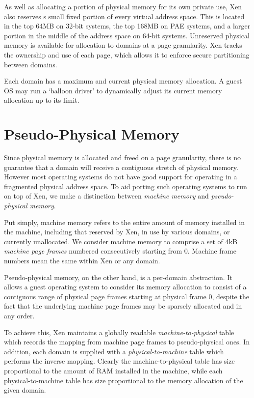 \documentclass[11pt,twoside,final,openright,a4paper]{report}
\begin{document}
As well as allocating a portion of physical memory for its own private
use, Xen also reserves s small fixed portion of every virtual address
space. This is located in the top 64MB on 32-bit systems, the top
168MB on PAE systems, and a larger portion in the middle of the
address space on 64-bit systems. Unreserved physical memory is
available for allocation to domains at a page granularity.  Xen tracks
the ownership and use of each page, which allows it to enforce secure
partitioning between domains.

Each domain has a maximum and current physical memory allocation.  A
guest OS may run a `balloon driver' to dynamically adjust its current
memory allocation up to its limit.


\section{Pseudo-Physical Memory}

Since physical memory is allocated and freed on a page granularity,
there is no guarantee that a domain will receive a contiguous stretch
of physical memory. However most operating systems do not have good
support for operating in a fragmented physical address space. To aid
porting such operating systems to run on top of Xen, we make a
distinction between \emph{machine memory} and \emph{pseudo-physical
  memory}.

Put simply, machine memory refers to the entire amount of memory
installed in the machine, including that reserved by Xen, in use by
various domains, or currently unallocated. We consider machine memory
to comprise a set of 4kB \emph{machine page frames} numbered
consecutively starting from 0. Machine frame numbers mean the same
within Xen or any domain.

Pseudo-physical memory, on the other hand, is a per-domain
abstraction. It allows a guest operating system to consider its memory
allocation to consist of a contiguous range of physical page frames
starting at physical frame 0, despite the fact that the underlying
machine page frames may be sparsely allocated and in any order.

To achieve this, Xen maintains a globally readable {\it
  machine-to-physical} table which records the mapping from machine
page frames to pseudo-physical ones. In addition, each domain is
supplied with a {\it physical-to-machine} table which performs the
inverse mapping. Clearly the machine-to-physical table has size
proportional to the amount of RAM installed in the machine, while each
physical-to-machine table has size proportional to the memory
allocation of the given domain.
\end{document}
